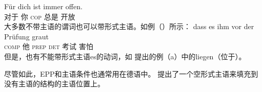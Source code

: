 \ex\label{ex-fuer-dich-ist-immer-offen}
\gll Für dich ist immer offen.\footnotemark\\
	 对于 你 \textsc{cop} 总是 开放\\
\zl
大多数不带主语的谓词也可以带形式主语。如例（）所示：
\ea
\gll dass es ihm vor der Prüfung graut\\
	 \textsc{comp} \expl{} 他 \textsc{prep} \textsc{det} 考试 害怕\\
\z
但是，也有不能带形式主语es的动词，如 \citet[]{Reis82}提出的例（a）中的liegen（位于）。

\eal
{}
\zl

\noindent
尽管如此，EPP和主语条件也通常用在德语中。 \citet[]{Grewendorf93}提出了一个空形式主语来填充到没有主语的结构的主语位置上。

